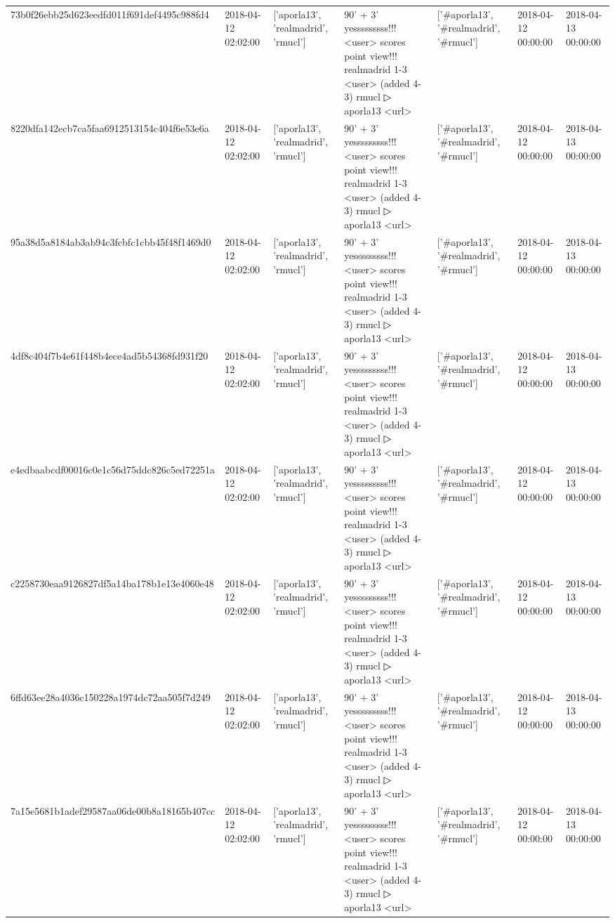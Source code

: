 \begin{tabular}{lllllll}
73b0f26ebb25d623eedfd011f691def4495c988fd4 & 2018-04-12 02:02:00 & ['aporla13', 'realmadrid', 'rmucl'] & 90' + 3' yesssssssss!!! <user> scores point view!!! realmadrid 1-3 <user> (added 4-3) rmucl ▷ aporla13 <url> & ['#aporla13', '#realmadrid', '#rmucl'] & 2018-04-12 00:00:00 & 2018-04-13 00:00:00 \\
8220dfa142ecb7ca5faa6912513154c404f6e53e6a & 2018-04-12 02:02:00 & ['aporla13', 'realmadrid', 'rmucl'] & 90' + 3' yesssssssss!!! <user> scores point view!!! realmadrid 1-3 <user> (added 4-3) rmucl ▷ aporla13 <url> & ['#aporla13', '#realmadrid', '#rmucl'] & 2018-04-12 00:00:00 & 2018-04-13 00:00:00 \\
95a38d5a8184ab3ab94c3fcbfc1cbb45f48f1469d0 & 2018-04-12 02:02:00 & ['aporla13', 'realmadrid', 'rmucl'] & 90' + 3' yesssssssss!!! <user> scores point view!!! realmadrid 1-3 <user> (added 4-3) rmucl ▷ aporla13 <url> & ['#aporla13', '#realmadrid', '#rmucl'] & 2018-04-12 00:00:00 & 2018-04-13 00:00:00 \\
4df8c404f7b4e61f448b4ece4ad5b54368fd931f20 & 2018-04-12 02:02:00 & ['aporla13', 'realmadrid', 'rmucl'] & 90' + 3' yesssssssss!!! <user> scores point view!!! realmadrid 1-3 <user> (added 4-3) rmucl ▷ aporla13 <url> & ['#aporla13', '#realmadrid', '#rmucl'] & 2018-04-12 00:00:00 & 2018-04-13 00:00:00 \\
e4edbaabcdf00016c0e1c56d75ddc826c5ed72251a & 2018-04-12 02:02:00 & ['aporla13', 'realmadrid', 'rmucl'] & 90' + 3' yesssssssss!!! <user> scores point view!!! realmadrid 1-3 <user> (added 4-3) rmucl ▷ aporla13 <url> & ['#aporla13', '#realmadrid', '#rmucl'] & 2018-04-12 00:00:00 & 2018-04-13 00:00:00 \\
c2258730eaa9126827df5a14ba178b1e13e4060e48 & 2018-04-12 02:02:00 & ['aporla13', 'realmadrid', 'rmucl'] & 90' + 3' yesssssssss!!! <user> scores point view!!! realmadrid 1-3 <user> (added 4-3) rmucl ▷ aporla13 <url> & ['#aporla13', '#realmadrid', '#rmucl'] & 2018-04-12 00:00:00 & 2018-04-13 00:00:00 \\
6ffd63ee28a4036c150228a1974dc72aa505f7d249 & 2018-04-12 02:02:00 & ['aporla13', 'realmadrid', 'rmucl'] & 90' + 3' yesssssssss!!! <user> scores point view!!! realmadrid 1-3 <user> (added 4-3) rmucl ▷ aporla13 <url> & ['#aporla13', '#realmadrid', '#rmucl'] & 2018-04-12 00:00:00 & 2018-04-13 00:00:00 \\
7a15e5681b1adef29587aa06de00b8a18165b407cc & 2018-04-12 02:02:00 & ['aporla13', 'realmadrid', 'rmucl'] & 90' + 3' yesssssssss!!! <user> scores point view!!! realmadrid 1-3 <user> (added 4-3) rmucl ▷ aporla13 <url> & ['#aporla13', '#realmadrid', '#rmucl'] & 2018-04-12 00:00:00 & 2018-04-13 00:00:00 \\

\end{tabular}
